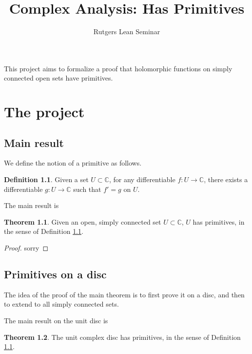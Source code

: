 \documentclass{report}
\title{Complex Analysis: Has Primitives}
\author{Rutgers Lean Seminar}
\theoremstyle{definition}
\newtheorem{definition}{Definition}
\newtheorem{theorem}{Theorem}
\begin{document}
\maketitle

This project aims to formalize a proof that holomorphic functions on simply connected open sets have primitives.

\chapter{The project}

\section{Main result}


We define the notion of a primitive as follows.

\begin{definition}
  \label{hasPrimitives}
  \leanok
  Given a set $U\subset\mathbb C$, for any differentiable $f:U\to\mathbb C$, there exists a differentiable $g:U\to\mathbb C$ such that $f'=g$ on $U$.
\end{definition}

The main result is

\begin{theorem}
  \label{hasPrimitivesOfSimplyConnected}
  \leanok
  Given an open, simply connected set $U\subset\mathbb C$, $U$ has primitives, in the sense of Definition \ref{hasPrimitives}.
\end{theorem}

\begin{proof}
  sorry
\end{proof}

\section{Primitives on a disc}
The idea of the proof of the main theorem is to first prove it on a disc, and then to extend to all simply connected sets.

The main result on the unit disc is

\begin{theorem}
  \label{hasPrimitivesOfDisc}
  \leanok
  The unit complex disc has primitives, in the sense of Definition \ref{hasPrimitives}.
\end{theorem}
\end{document}
